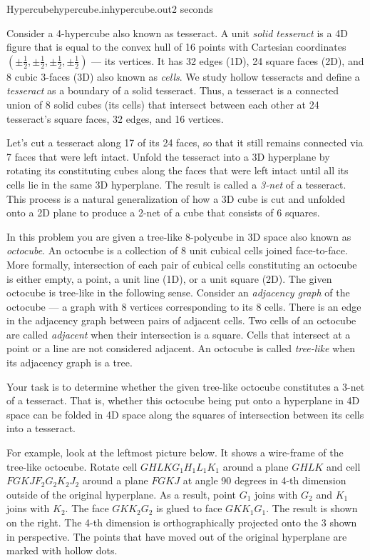 \begin{problem}{Hypercube}{hypercube.in}{hypercube.out}{2 seconds}


Consider a 4-hypercube also known as tesseract. A unit \emph{solid tesseract} is a 4D figure that 
is equal to the convex hull of 16 points with Cartesian coordinates $(\pm\frac{1}{2},\pm\frac{1}{2},\pm\frac{1}{2},\pm\frac{1}{2})$ ---
its vertices. It has 32 edges (1D), 24 square faces (2D), and 8 cubic 3-faces (3D) also known as \emph{cells}. 
We study hollow tesseracts and define a \emph{tesseract} as a boundary of a solid tesseract. Thus, a tesseract
is a connected union of 8 solid cubes (its cells) that intersect between each other at 
24 tesseract's square faces, 32 edges, and 16 vertices.

Let's cut a tesseract along 17 of its 24 faces, so that it still remains connected via 7 faces that were left intact. 
Unfold the tesseract into a 3D hyperplane by rotating its constituting cubes along the faces that were left intact until
all its cells lie in the same 3D hyperplane. The result is called a \emph{3-net} of a tesseract. This process is a
natural generalization of how a 3D cube is cut and unfolded onto a 2D plane to produce a 2-net of a cube that consists
of 6 squares. 

In this problem you are given a tree-like 8-polycube in 3D space also known as \emph{octocube}. 
An octocube is a collection of 8 unit cubical cells joined face-to-face.
More formally, intersection of each pair of cubical cells constituting an octocube is either empty, a point, a unit line (1D), or a unit square (2D). 
The given octocube is tree-like in the following sense. Consider an \emph{adjacency graph} of the octocube --- 
a graph with 8 vertices corresponding to its 8 cells. There is an edge in the adjacency graph between pairs of adjacent cells. 
Two cells of an octocube are called \emph{adjacent} when their intersection is a square. Cells that intersect at a point or a line are not considered adjacent.
An octocube is called \emph{tree-like} when its adjacency graph is a tree.

Your task is to determine whether the given tree-like octocube constitutes a 3-net of a tesseract. 
That is, whether this octocube being put onto a hyperplane in 4D space can be folded in 4D space along the squares of intersection
between its cells into a tesseract.

For example, look at the leftmost picture below. It shows a wire-frame of the tree-like octocube. Rotate cell
$GHLKG_1H_1L_1K_1$ around a plane $GHLK$ and cell $FGKJF_2G_2K_2J_2$ around a plane $FGKJ$ at angle 90 degrees in 4-th
dimension outside of the original hyperplane. As a result, point $G_1$ joins with $G_2$ and $K_1$ joins with $K_2$. The face
$GKK_2G_2$ is glued to face $GKK_1G_1$. The result is shown on the right. The 4-th dimension is orthographically projected onto 
the 3 shown in perspective.
The points that have moved out of the original hyperplane are marked with hollow dots.


\end{problem}
